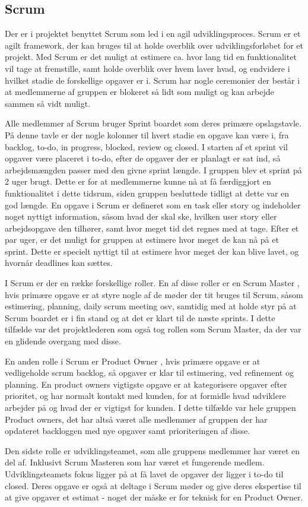\subsection{Scrum}

Der er i projektet benyttet Scrum  som led i en agil udviklingsproces. Scrum er et agilt framework, der kan bruges til at holde overblik over udviklingsforløbet for et projekt. Med Scrum er det muligt at estimere ca. hvor lang tid en funktionalitet vil tage at fremstille, samt holde overblik over hvem laver hvad, og endvidere i hvilket stadie de forskellige opgaver er i. Scrum har nogle ceremonier der består i at medlemmerne af gruppen er blokeret så lidt som muligt og kan arbejde sammen så vidt muligt.

Alle medlemmer af Scrum bruger Sprint boardet som deres primære opslagstavle. På denne tavle er der nogle kolonner til hvert stadie en opgave kan være i, fra backlog, to-do, in progress, blocked, review og closed. I starten af et sprint vil opgaver være placeret i to-do, efter de opgaver der er planlagt er sat ind, så arbejdsmængden passer med den givne sprint længde. I gruppen blev et sprint på 2 uger brugt. Dette er for at medlemmerne kunne nå at få færdiggjort en funktionalitet i dette tidsrum, siden gruppen besluttede tidligt at dette var en god længde. En opgave i Scrum er defineret som en task eller story og indeholder noget nyttigt information, såsom hvad der skal ske, hvilken user story eller arbejdsopgave den tilhører, samt hvor meget tid det regnes med at tage. Efter et par uger, er det muligt for gruppen at estimere hvor meget de kan nå på et sprint. Dette er specielt nyttigt til at estimere hvor meget der kan blive lavet, og hvornår deadlines kan sættes.

I Scrum er der en række forskellige roller. En af disse roller er en Scrum Master , hvis primære opgave er at styre nogle af de møder der tit bruges til Scrum, såsom estimering, planning, daily scrum meeting osv, samtidig med at holde styr på at Scrum boardet er i fin stand og at det er klart til de næste sprints. I dette tilfælde var det projektlederen som også tog rollen som Scrum Master, da der var en glidende overgang med disse.

En anden rolle i Scrum er Product Owner , hvis primære opgave er at vedligeholde scrum backlog, så opgaver er klar til estimering, ved refinement og planning. En product owners vigtigste opgave er at kategorisere opgaver efter prioritet, og har normalt kontakt med kunden, for at formidle hvad udviklere arbejder på og hvad der er vigtigst for kunden. I dette tilfælde var hele gruppen Product owners, det har altså været alle medlemmer af gruppen der har opdateret backloggen med nye opgaver samt prioriteringen af disse.

Den sidste rolle er udviklingsteamet, som alle gruppens medlemmer har været en del af. Inklusivt Scrum Masteren som har været et fungerende medlem. Udviklingsteamets fokus ligger på at få lavet de opgaver der ligger i to-do til closed. Deres opgave er også at deltage i Scrum møder og give deres ekspertise til at give opgaver et estimat - noget der måske er for teknisk for en Product Owner.